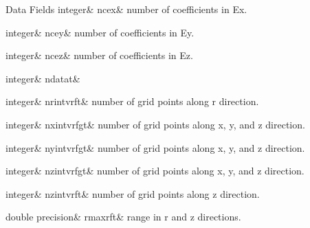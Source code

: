 \begin{DoxyFields}{Data Fields}
\mbox{\label{namespacedataclass_ad95160bd02ade87e93fc035a9851fb78}} 
integer&
ncex&
number of coefficients in Ex. \\
\hline

\mbox{\label{namespacedataclass_a3d45c0760de77d30e22c5bedf5b0738b}} 
integer&
ncey&
number of coefficients in Ey. \\
\hline

\mbox{\label{namespacedataclass_a8c35d3f6fc1a03f3bf4d5bc3dc8a90a9}} 
integer&
ncez&
number of coefficients in Ez. \\
\hline

\mbox{\label{namespacedataclass_adc972e43934cfad57f7572c12a8921d3}} 
integer&
ndatat&
\\
\hline

\mbox{\label{namespacedataclass_aa5ca1fbf50c64fd3111f84c05b27a626}} 
integer&
nrintvrft&
number of grid points along r direction. \\
\hline

\mbox{\label{namespacedataclass_a9746624865dee3cb084893c584d68b39}} 
integer&
nxintvrfgt&
number of grid points along x, y, and z direction. \\
\hline

\mbox{\label{namespacedataclass_a57cb8c3f96c761c3253882bf8ea9aca3}} 
integer&
nyintvrfgt&
number of grid points along x, y, and z direction. \\
\hline

\mbox{\label{namespacedataclass_afce0f79fa31eb44ce2deb1e1ff0efca9}} 
integer&
nzintvrfgt&
number of grid points along x, y, and z direction. \\
\hline

\mbox{\label{namespacedataclass_a0f84e89e0c3f2e8b8ac1b6b09b5e6b71}} 
integer&
nzintvrft&
number of grid points along z direction. \\
\hline

\mbox{\label{namespacedataclass_ad3d3c49a06ccba3d74cec08ccac3ba74}} 
double precision&
rmaxrft&
range in r and z directions. \\
\hline


\end{DoxyFields}

